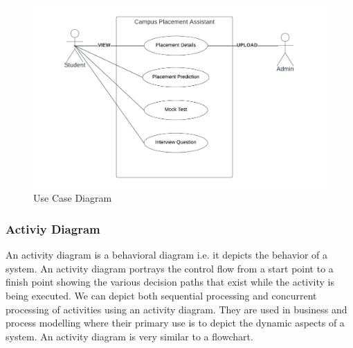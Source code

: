 \documentclass[12pt]{article}
\begin{document}
\begin{figure}[H]
\begin{center}
\includegraphics[scale=.8]{use case diagram}
\caption{Use Case Diagram}
\end{center}
\end{figure}

\newpage
\subsubsection{Activiy Diagram}

An activity diagram is a behavioral diagram i.e. it depicts the behavior of a system. An activity diagram portrays the control flow from a start point to a finish point showing the various decision paths that exist while the activity is being executed. We can depict both sequential processing and concurrent processing of activities using an activity diagram. They are used in business and process modelling where their primary use is to depict the dynamic aspects of a system. An activity diagram is very similar to a flowchart.
\end{document}
